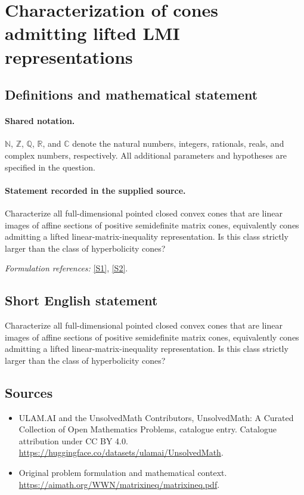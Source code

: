 \documentclass[11pt]{article}
\newcommand{\sref}[2]{\hyperlink{source:#1:#2}{[S#2]}}
\begin{document}
\section{Characterization of cones admitting lifted LMI representations}\label{statement}

\subsection{Definitions and mathematical statement}

\paragraph{Shared notation.}$\mathbb N$, $\mathbb Z$, $\mathbb Q$, $\mathbb R$, and $\mathbb C$ denote the natural numbers, integers, rationals, reals, and complex numbers, respectively. All additional parameters and hypotheses are specified in the question.


\paragraph{Statement recorded in the supplied source.}
Characterize all full-dimensional pointed closed convex cones that are linear images of affine sections of positive semidefinite matrix cones, equivalently cones admitting a lifted linear-matrix-inequality representation. Is this class strictly larger than the class of hyperbolicity cones?
\par\smallskip\textit{Formulation references:} \sref{statement}{1}, \sref{statement}{2}.
\subsection{Short English statement}
Characterize all full-dimensional pointed closed convex cones that are linear images of affine sections of positive semidefinite matrix cones, equivalently cones admitting a lifted linear-matrix-inequality representation. Is this class strictly larger than the class of hyperbolicity cones?
\subsection{Sources}
\begin{itemize}
\item[\hypertarget{source:statement:1}{S1}] ULAM.AI and the UnsolvedMath Contributors, UnsolvedMath: A Curated Collection of Open Mathematics Problems, catalogue entry. Catalogue attribution under CC BY 4.0.
\url{https://huggingface.co/datasets/ulamai/UnsolvedMath}.
\item[\hypertarget{source:statement:2}{S2}] Original problem formulation and mathematical context.
\url{https://aimath.org/WWN/matrixineq/matrixineq.pdf}.
\end{itemize}
\label{end:statement}
\end{document}
